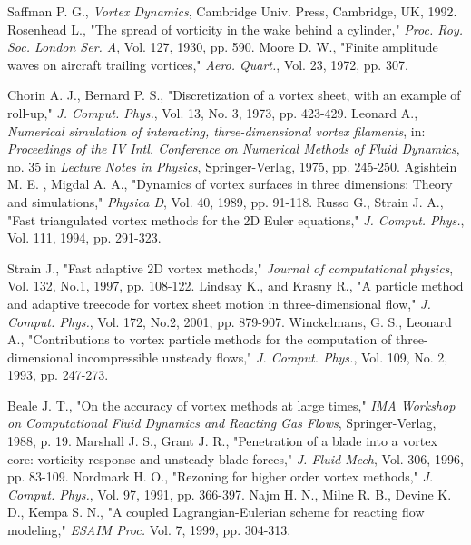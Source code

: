\documentclass[]{aiaa-tc}%
\begin{document}
\begin{thebibliography}{9}%
Saffman P. G., \textit{Vortex Dynamics}, Cambridge Univ. Press, Cambridge, UK, 1992.
Rosenhead L., "The spread of vorticity in the wake behind a cylinder," \textit{Proc. Roy. Soc. London Ser. A}, Vol. 127, 1930, pp. 590.
Moore D. W., "Finite amplitude waves on aircraft trailing vortices," \textit{Aero. Quart.}, Vol. 23, 1972, pp. 307.

Chorin A. J., Bernard P. S., "Discretization of a vortex sheet, with an example of roll-up," \textit{J. Comput. Phys.}, Vol. 13, No. 3, 1973, pp. 423-429.
Leonard A., \textit{Numerical simulation of interacting, three-dimensional vortex filaments}, in: \textit{Proceedings of the IV Intl. Conference on Numerical Methods of Fluid Dynamics}, no. 35 in \textit{Lecture Notes in Physics}, Springer-Verlag, 1975, pp. 245-250.
Agishtein M. E. , Migdal A. A., "Dynamics of vortex surfaces in three dimensions: Theory and simulations," \textit{Physica D}, Vol. 40, 1989, pp. 91-118.
Russo G., Strain J. A., "Fast triangulated vortex methods for the 2D Euler equations," \textit{J. Comput. Phys.}, Vol. 111, 1994, pp. 291-323.

Strain J., "Fast adaptive 2D vortex methods," \textit{Journal of computational physics}, Vol. 132, No.1, 1997, pp. 108-122.
Lindsay K., and Krasny R., "A particle method and adaptive treecode for vortex sheet motion in three-dimensional flow," \textit{J. Comput. Phys.}, Vol. 172, No.2, 2001, pp. 879-907.
Winckelmans, G. S., Leonard A., "Contributions to vortex particle methods for the computation of three-dimensional incompressible unsteady flows," \textit{J. Comput. Phys.}, Vol. 109, No. 2, 1993, pp. 247-273.

Beale J. T., "On the accuracy of vortex methods at large times,"  \textit{IMA Workshop on Computational Fluid Dynamics and Reacting Gas Flows}, Springer-Verlag, 1988, p. 19.
Marshall J. S., Grant J. R., "Penetration of a blade into a vortex core: vorticity response and unsteady blade forces," \textit{J. Fluid Mech}, Vol. 306, 1996, pp. 83-109.
Nordmark H. O., "Rezoning for higher order vortex methods," \textit{J. Comput. Phys.}, Vol. 97, 1991, pp. 366-397.
Najm H. N., Milne R. B., Devine K. D., Kempa S. N., "A coupled Lagrangian-Eulerian scheme for reacting flow modeling," \textit{ESAIM Proc.} Vol. 7, 1999, pp. 304-313.


\end{thebibliography}
\end{document}

